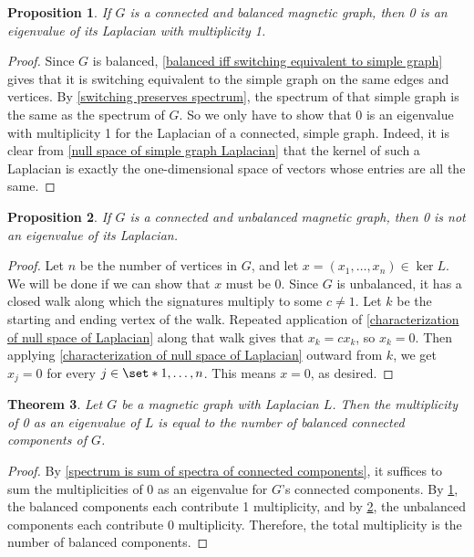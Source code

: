 \documentclass[12pt]{article}
\newtheorem{thm}{Theorem}
\newtheorem{prop}[thm]{Proposition}
\theoremstyle{definition}
\begin{document}
\begin{prop}\label{multiplicity of 0 for connected balanced graph}
If $G$ is a connected and balanced magnetic graph, then 0 is an eigenvalue of its Laplacian with multiplicity 1. 
\end{prop}
\begin{proof}
Since $G$ is balanced, \cref{balanced iff switching equivalent to simple graph} gives that it is switching equivalent to the simple graph on the same edges and vertices. By \cref{switching preserves spectrum}, the spectrum of that simple graph is the same as the spectrum of $G$. So we only have to show that 0 is an eigenvalue with multiplicity 1 for the Laplacian of a connected, simple graph. Indeed, it is clear from \cref{null space of simple graph Laplacian} that the kernel of such a Laplacian is exactly the one-dimensional space of vectors whose entries are all the same.   
\end{proof}

\begin{prop}\label{multiplicity of 0 for connected unbalanced graph}
If $G$ is a connected and unbalanced magnetic graph, then 0 is not an eigenvalue of its Laplacian. 
\end{prop}
\begin{proof}
Let $n$ be the number of vertices in $G$, and let $x = (x_1, \dots, x_n) \in \ker L$. We will be done if we can show that $x$ must be $0$. Since $G$ is unbalanced, it has a closed walk along which the signatures multiply to some $c \neq 1$. Let $k$ be the starting and ending vertex of the walk. Repeated application of \cref{characterization of null space of Laplacian} along that walk gives that $x_k = c x_k$, so $x_k = 0$. Then applying \cref{characterization of null space of Laplacian} outward from $k$, we get $x_j = 0$ for every $j \in \set*{1, \dots, n}$. This means $x = 0$, as desired.
\end{proof}

\begin{thm}
Let $G$ be a magnetic graph with Laplacian $L$. Then the multiplicity of 0 as an eigenvalue of $L$ is equal to the number of balanced connected components of $G$.
\end{thm}
\begin{proof}
By \cref{spectrum is sum of spectra of connected components}, it suffices to sum the multiplicities of 0 as an eigenvalue for $G$'s connected components. By \cref{multiplicity of 0 for connected balanced graph}, the balanced components each contribute 1 multiplicity, and by \cref{multiplicity of 0 for connected unbalanced graph}, the unbalanced components each contribute 0 multiplicity. Therefore, the total multiplicity is the number of balanced components.
\end{proof}
\end{document}
